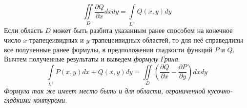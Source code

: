 \documentclass[12pt,a4paper]{article}
\begin{document}
	\[ \iint\limits_{D} \frac{\partial Q}{\partial x} dxdy = \int\limits_{L^{+}} Q(x,y) dy \]
	Если область $D$ может быть разбита указанным ранее способом на конечное число $x$-трапецеивидных и $y$-трапецеивидных областей, то для неё справедливы все полученные ранее формулы, в предположении гладкости функций $P$ и $Q$.
	Вычтем полученные результаты и выведем \textit{формулу Грина}.
	\[ \int\limits_{L^{+}} P(x,y)dx + Q(x,y) dy = \iint\limits_{D} (\frac{\partial Q}{\partial x} - \frac{\partial P}{\partial y} ) dxdy\]
	\textit{Формула так же имеет место быть и для области, ограниченной кусочно-гладкими контуроми.}
\end{document}
